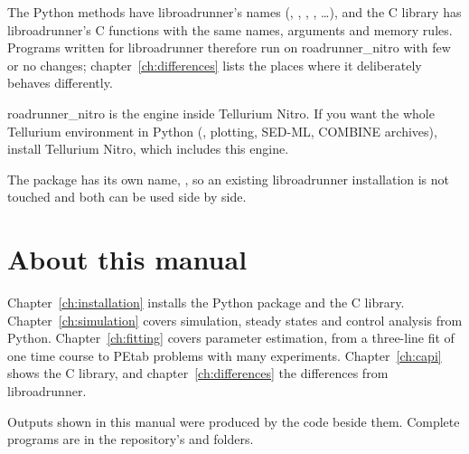The Python methods have libroadrunner's names (, , ,
, \ldots), and the C library has libroadrunner's C functions with the same names, arguments and
memory rules. Programs written for libroadrunner therefore run on roadrunner\_nitro with few or no changes;
chapter~\ref{ch:differences} lists the places where it deliberately behaves differently.

roadrunner\_nitro is the engine inside Tellurium Nitro. If you want the whole Tellurium environment in Python
(, plotting, SED-ML, COMBINE archives), install Tellurium Nitro, which includes this engine.

The package has its own name, , so an existing libroadrunner installation is not
touched and both can be used side by side.

\section{About this manual}

Chapter~\ref{ch:installation} installs the Python package and the C library. Chapter~\ref{ch:simulation} covers
simulation, steady states and control analysis from Python. Chapter~\ref{ch:fitting} covers parameter
estimation, from a three-line fit of one time course to PEtab problems with many experiments.
Chapter~\ref{ch:capi} shows the C library, and chapter~\ref{ch:differences} the differences from libroadrunner.

Outputs shown in this manual were produced by the code beside them. Complete programs are in the repository's
 and  folders.
